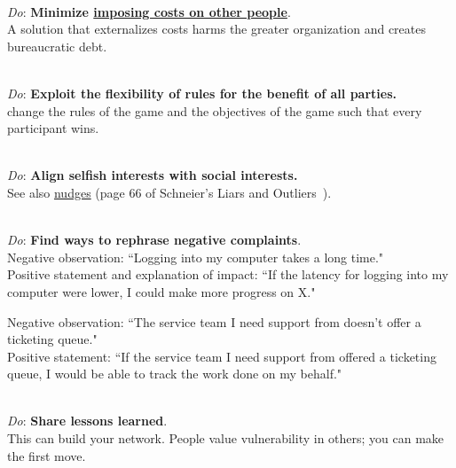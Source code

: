 \ \\
\textit{Do}: \textbf{Minimize \href{https://en.wikipedia.org/wiki/Externality}{imposing costs on other people}}.\\
\iftoggle{WPinmargin}{\marginpar{$>$Wikipedia: externality}}{}
A solution that externalizes costs harms the greater organization and creates bureaucratic debt.

\ \\
\textit{Do}: \textbf{Exploit the flexibility of rules for the benefit of all parties.}\\
change the rules of the game and the objectives of the game such that every participant wins.

\ \\
\textit{Do}: \textbf{Align selfish interests with social interests.}\\
See also \href{https://en.wikipedia.org/wiki/Nudge_theory}{nudges}
\iftoggle{WPinmargin}{\marginpar{$>$Wikipedia: Nudge theory}}{}
(page 66 of Schneier's Liars and Outliers~\cite{2012_Schneier}).

\ \\
\textit{Do}: \textbf{Find ways to rephrase negative complaints}.\\
Negative observation: ``Logging into my computer takes a long time."\\
Positive statement and explanation of impact: ``If the latency for logging into my computer were lower, I could make more progress on X."


Negative observation: ``The service team I need support from doesn't offer a ticketing queue."\\
Positive statement: ``If the service team I need support from offered a ticketing queue, I would be able to track the work done on my behalf."

\ \\
\textit{Do}: \textbf{Share lessons learned}.\\
This can build your network. People value vulnerability in others; you can make the first move. 